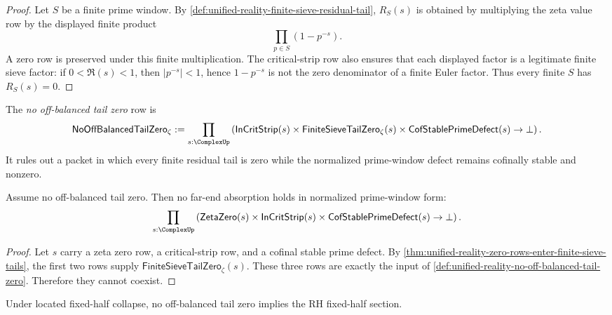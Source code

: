 \begin{proof}
Let $S$ be a finite prime window.  By
\autoref{def:unified-reality-finite-sieve-residual-tail},
$R_S(s)$ is obtained by multiplying the zeta value row by the displayed
finite product
$$
\prod_{p\in S}(1-p^{-s}).
$$
A zero row is preserved under this finite multiplication.  The
critical-strip row also ensures that each displayed factor is a legitimate
finite sieve factor: if $0<\Re(s)<1$, then $|p^{-s}|<1$, hence
$1-p^{-s}$ is not the zero denominator of a finite Euler factor.  Thus
every finite $S$ has $R_S(s)=0$.
\end{proof}

\begin{definition}
\label{def:unified-reality-no-off-balanced-tail-zero}
The \emph{no off-balanced tail zero} row is
$$
\mathsf{NoOffBalancedTailZero}_{\zeta}
:=
\prod_{s:\ComplexUp}
\left(
\mathsf{InCritStrip}(s)
\times
\mathsf{FiniteSieveTailZero}_{\zeta}(s)
\times
\mathsf{CofStablePrimeDefect}(s)
\to
\bot
\right).
$$
It rules out a packet in which every finite residual tail is zero while
the normalized prime-window defect remains cofinally stable and nonzero.
\end{definition}

\begin{theorem}
\label{thm:unified-reality-no-off-balanced-tail-zero-gives-no-absorption}
Assume no off-balanced tail zero.  Then no far-end absorption holds in
normalized prime-window form:
$$
\prod_{s:\ComplexUp}
\left(
\mathsf{ZetaZero}(s)
\times
\mathsf{InCritStrip}(s)
\times
\mathsf{CofStablePrimeDefect}(s)
\to
\bot
\right).
$$
\end{theorem}

\begin{proof}
Let $s$ carry a zeta zero row, a critical-strip row, and a cofinal stable
prime defect.  By
\autoref{thm:unified-reality-zero-rows-enter-finite-sieve-tails}, the
first two rows supply $\mathsf{FiniteSieveTailZero}_{\zeta}(s)$.  These
three rows are exactly the input of
\autoref{def:unified-reality-no-off-balanced-tail-zero}.  Therefore they
cannot coexist.
\end{proof}

\begin{corollary}
\label{cor:unified-reality-no-off-balanced-tail-zero-gives-rh-section}
Under located fixed-half collapse, no off-balanced tail zero implies the
RH fixed-half section.
\end{corollary}


